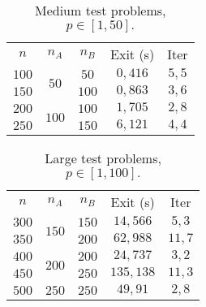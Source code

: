 \documentclass[opre,nonblindrev]{informs3} %
\begin{document}
\begin{table}[h]\scriptsize
	\begin{center}
		\begin{tabular}{|| c |c | c|| c||c ||}\hline
			
			\multirow{3}{*}{$n$} & \multirow{3}{*}{$n_A$} & \multirow{3}{*}{$n_B$} & \multirow{3}{*}{Exit (s)} & \multirow{3}{*}{Iter}\\
			&  &&  & \\
			&    &    &  &\\\hline
			$100$	 & \multirow{2}{*}{$50$}   & $50$   & $0,416$
			&$5,5$
			\\
			$150$  &  & $100$	 &$0,863$
			&$3,6$
			\\ \hline
			
			$200$	 & \multirow{2}{*}{$100$}   & $100$   & $1,705$
			&$2,8$
			\\
			$250$  &  & $150$	 & $6,121$
			&$4,4$
			\\ \hline
			
		\end{tabular}
	\end{center}
	\caption{Medium test problems, $p \in [1,50].$} \label{large}
\end{table}


\begin{table}[h]\scriptsize
	\begin{center}
		\begin{tabular}{|| c |c | c|| c||c ||}\hline
			
			\multirow{3}{*}{$n$} & \multirow{3}{*}{$n_A$} & \multirow{3}{*}{$n_B$} & \multirow{3}{*}{Exit (s)} & \multirow{3}{*}{Iter}\\
			&  &&  & \\
			&    &    & &\\\hline
			$300$	 & \multirow{2}{*}{$150$}   & $150$   &$14,566$
			& $5,3$
			\\
			$350$  &  & $200$	 &$ 62,988$
			&$11,7$
			\\ \hline
			
			$400$	 & \multirow{2}{*}{$200$}   & $200$   &$ 24,737$
			&$3,2$
			\\
			$450$  &  & $250$	 &$135,138$
			&$11,3$
			\\ \hline
			
			$500$	 & $250$   & $250$   &  $49,91$
			&$2,8$
			\\ \hline
			
		\end{tabular}
	\end{center}
	\caption{Large test problems, $p \in [1,100].$} \label{large}
\end{table}
\end{document}
